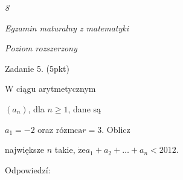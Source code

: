 \documentclass[a4paper,12pt]{article}
\begin{document}
{\it 8}

{\it Egzamin maturalny z matematyki}

{\it Poziom rozszerzony}

Zadanie 5. (5pkt)

W ciągu arytmetycznym

$(a_{n})$, dla $n\geq 1$, dane są

$a_{1}=-2$ oraz róz$\mathrm{m}\mathrm{c}\mathrm{a} r=3$. Oblicz

największe $n$ takie, $\dot{\mathrm{z}}\mathrm{e}a_{1}+a_{2}+\ldots+a_{n}<2012.$

Odpowiedzí:
\end{document}
